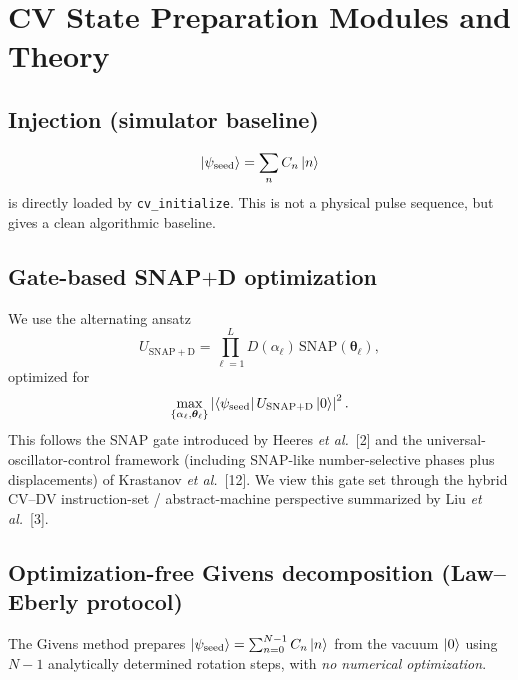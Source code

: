 \documentclass[11pt]{article}
\begin{document}
\section{CV State Preparation Modules and Theory}
\subsection{Injection (simulator baseline)}
\begin{equation}
\ket{\psi_{\mathrm{seed}}}=\sum_n C_n\ket{n}
\end{equation}
is directly loaded by \texttt{cv\_initialize}. This is not a physical pulse sequence, but gives a clean algorithmic baseline.

\subsection{Gate-based SNAP$+$D optimization}
We use the alternating ansatz
\begin{equation}
U_{\mathrm{SNAP+D}}=\prod_{\ell=1}^{L}D(\alpha_\ell)\,\mathrm{SNAP}(\bm{\theta}_\ell),
\end{equation}
optimized for
\begin{equation}
\max_{\{\alpha_\ell,\bm{\theta}_\ell\}}
\left|\bra{\psi_{\mathrm{seed}}}
U_{\mathrm{SNAP+D}}\ket{0}\right|^2.
\end{equation}
This follows the SNAP gate introduced by Heeres \emph{et al.}~[2] and the universal-oscillator-control framework (including SNAP-like number-selective phases plus displacements) of Krastanov \emph{et al.}~[12]. We view this gate set through the hybrid CV--DV instruction-set / abstract-machine perspective summarized by Liu \emph{et al.}~[3].

\subsection{Optimization-free Givens decomposition (Law--Eberly protocol)}
\label{sec:givens}
The Givens method prepares $\ket{\psi_{\mathrm{seed}}}=\sum_{n=0}^{N-1}C_n\ket{n}$
from the vacuum $\ket{0}$ using $N-1$ analytically determined rotation steps,
with \emph{no numerical optimization}.
\end{document}
